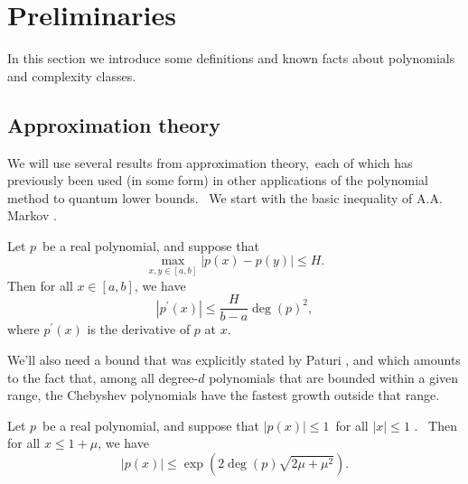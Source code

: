 \setcounter{section}{1}
\setcounter{theorem}{5}
\setcounter{equation}{4}
\section{Preliminaries}

\label{sec:prelim}

In this section we introduce some definitions and known facts about
polynomials and complexity classes.

%
\subsection{Approximation theory}
\label{s:approxprelim}
We will use several results from approximation theory,\ each of which has
previously been used (in some form) in other applications of the polynomial
method to quantum lower bounds. \ We start with the basic inequality of A.A.
Markov \cite{markov1890question}.

\begin{lemma}[Markov]
\label{markovlem}Let $p$\ be a real polynomial, and suppose that
\begin{equation}
\max_{x,y\in\left[ a,b\right] }\left\vert p\left( x\right) -p\left( y\right)
\right\vert \leq H.
\end{equation}
Then for all $x\in\left[ a,b\right] $, we have
\begin{equation}
\left\vert p^{\prime}\left( x\right) \right\vert \leq\frac{H}{b-a}\deg\left(
p\right) ^{2},
\end{equation}
where $p^{\prime}(x)$ is the derivative of $p$ at $x$.
\end{lemma}

We'll also need a bound that was explicitly stated by Paturi \cite{paturi},
and which amounts to the fact that, among all degree-$d$
polynomials that are bounded within a given range, the Chebyshev polynomials
have the fastest growth outside that range.

\begin{lemma}[Paturi]
\label{paturilem}Let $p$\ be a real polynomial, and suppose that $\left\vert
p\left( x\right) \right\vert \leq1$\ for all $\left\vert x\right\vert \leq1$
. \ Then for all $x\leq1+\mu$, we have
\begin{equation}
\left\vert p\left( x\right) \right\vert \leq\exp\left( 2\deg\left( p\right)
\sqrt{2\mu+\mu^{2}}\right) .
\end{equation}
\end{lemma}

